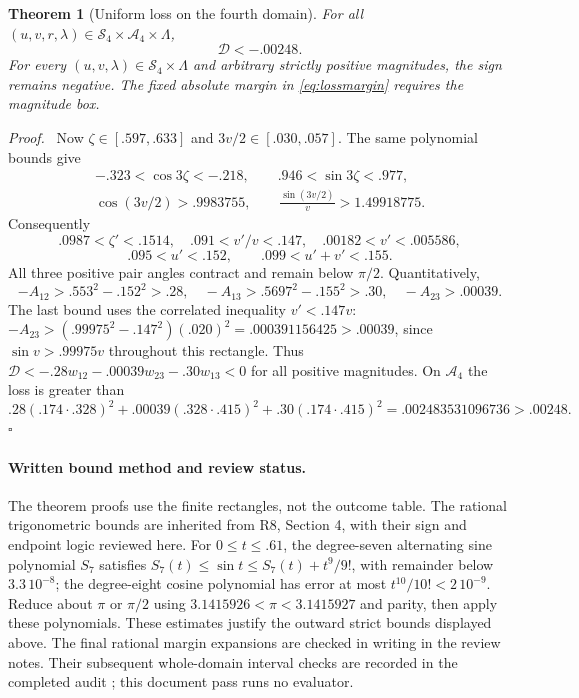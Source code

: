 \documentclass[11pt,a4paper]{article}
\numberwithin{equation}{section}
\newtheorem{theorem}{Theorem}[section]
\newenvironment{proof}[1][Proof]{\par\noindent\textit{#1.}\ \ignorespaces}
{\unskip\nobreak\hfill$\square$\par}
\begin{document}
\begin{theorem}[Uniform loss on the fourth domain]\label{thm:loss}
For all $(u,v,r,\lambda)\in\mathcal S_4\times\mathcal A_4\times\Lambda$,
\begin{equation}\label{eq:lossmargin}
\mathcal D<-.00248.
\end{equation}
For every $(u,v,\lambda)\in\mathcal S_4\times\Lambda$ and \emph{arbitrary}
strictly positive magnitudes, the sign remains negative. The fixed absolute
margin in \eqref{eq:lossmargin} requires the magnitude box.
\end{theorem}
\begin{proof}
Now $\zeta\in[.597,.633]$ and $3v/2\in[.030,.057]$. The same polynomial
bounds give
\[
\begin{gathered}
-.323<\cos3\zeta<-.218,\qquad .946<\sin3\zeta<.977,\\
\cos(3v/2)>.9983755,\qquad
\frac{\sin(3v/2)}v>1.49918775.
\end{gathered}
\]
Consequently
\[
.0987<\zeta'<.1514,\quad .091<v'/v<.147,\quad
.00182<v'<.005586,
\]
\[
.095<u'<.152,\qquad .099<u'+v'<.155.
\]
All three positive pair angles contract and remain below $\pi/2$.
Quantitatively,
\[
-A_{12}>.553^2-.152^2>.28,\quad
-A_{13}>.5697^2-.155^2>.30,\quad -A_{23}>.00039.
\]
The last bound uses the correlated inequality $v'<.147v$:
$-A_{23}>(.99975^2-.147^2)(.020)^2=.000391156425>.00039$,
since $\sin v>.99975v$ throughout this rectangle.
Thus $\mathcal D<-.28w_{12}-.00039w_{23}-.30w_{13}<0$ for all positive
magnitudes. On $\mathcal A_4$ the loss is greater than
\[
.28(.174\cdot.328)^2+.00039(.328\cdot.415)^2
+.30(.174\cdot.415)^2
=.002483531096736>.00248 .
\]
\end{proof}

\paragraph{Written bound method and review status.}
The theorem proofs use the finite rectangles, not the outcome table.
The rational trigonometric bounds are inherited from R8, Section 4, with
their sign and endpoint logic reviewed here. For $0\leq t\leq.61$,
the degree-seven alternating sine polynomial $S_7$ satisfies
$S_7(t)\leq\sin t\leq S_7(t)+t^9/9!$, with remainder below
$3.3\,10^{-8}$; the degree-eight cosine polynomial has error at most
$t^{10}/10!<2\,10^{-9}$. Reduce about $\pi$ or $\pi/2$ using
$3.1415926<\pi<3.1415927$ and parity, then apply these polynomials.
These estimates justify the outward strict bounds displayed above.
The final rational margin expansions are checked in writing in the review
notes. Their subsequent whole-domain interval checks are recorded in the completed audit \cite{Audit}; this document pass runs no evaluator.
\end{document}
